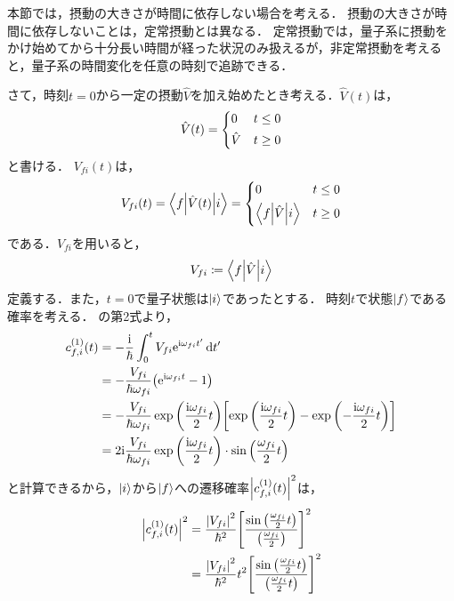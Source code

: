 \documentclass{report}
\begin{document}
  本節では，摂動の大きさが時間に依存しない場合を考える．
  摂動の大きさが時間に依存しないことは，定常摂動とは異なる．
  定常摂動では，量子系に摂動をかけ始めてから十分長い時間が経った状況のみ扱えるが，非定常摂動を考えると，量子系の時間変化を任意の時刻で追跡できる．
  \par
  さて，時刻$t = 0$から一定の摂動$\hat{V}$を加え始めたとき考える．$\hat{V}(t)$は，
  \begin{align}
    \hat{V}(t) =
    \begin{dcases}
      0 & t \leq 0 \\
      \hat{V} & t \geq 0
    \end{dcases}
  \end{align}
  と書ける．
  $V_{fi}(t)$は，
  \begin{align}
    V_{fi}(t) = \mel**{f}{\hat{V}(t)}{i} =
    \begin{dcases}
      0 & t \leq 0 \\
      \mel**{f}{\hat{V}}{i} & t \geq 0
    \end{dcases}
  \end{align}
  である．$V_{fi}$を用いると，
  \begin{align}
    V_{fi} \coloneqq \mel**{f}{\hat{V}}{i}
  \end{align}
  定義する．また，$t = 0$で量子状態は$\ket{i}$であったとする．
  時刻$t$で状態$\ket{f}$である確率を考える．
  の第2式より，
  \begin{align}
    c_{f, i}^{(1)}(t) &= -\frac{\mathrm{i}}{\hbar}\int_{0}^{t}V_{fi}\mathrm{e}^{\mathrm{i}\omega_{fi}t'}\dd{t'} \\
    &= -\frac{V_{fi}}{\hbar\omega_{fi}}\qty(\mathrm{e}^{\mathrm{i}\omega_{fi}t} - 1) \\ 
    &= -\frac{V_{fi}}{\hbar\omega_{fi}}\exp\qty(\frac{\mathrm{i}\omega_{fi}}{2}t)\qty[\exp\qty(\frac{\mathrm{i}\omega_{fi}}{2}t) - \exp\qty(-\frac{\mathrm{i}\omega_{fi}}{2}t)] \\ 
    &= 2\mathrm{i}\frac{V_{fi}}{\hbar\omega_{fi}}\exp\qty(\frac{\mathrm{i}\omega_{fi}}{2}t)\cdot\sin\qty(\frac{\omega_{fi}}{2}t)
  \end{align}
  と計算できるから，$\ket{i}$から$\ket{f}$への遷移確率$\abs{c_{f, i}^{(1)}(t)}^2$は，
  \begin{align}
    \abs{c_{f, i}^{(1)}(t)}^2 &= \frac{\abs{V_{fi}}^2}{\hbar^2}\qty[\frac{\sin\qty(\frac{\omega_{fi}}{2}t)}{\qty(\frac{\omega_{fi}}{2})}]^2 \\ 
    &= \frac{\abs{V_{fi}}^2}{\hbar^2}t^2\qty[\frac{\sin\qty(\frac{\omega_{fi}}{2}t)}{\qty(\frac{\omega_{fi}}{2}t)}]^2 \label{v-const-cfi-t}
  \end{align}
\end{document}

